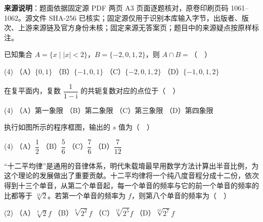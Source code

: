 

\begin{gktip}
\textbf{来源说明}：题面依据固定源 PDF 两页 A3 页面逐题核对，原卷印刷页码 1061–1062。源文件 SHA-256 已核实；固定源仅用于识别本库输入字节，出版者、版次、上游来源链及官方身份未核；固定来源无答案页；题目中的来源疑点按原样标注。
\end{gktip}


\begin{question}
已知集合 $A=\{x\mid |x|<2\}$，$B=\{-2,0,1,2\}$，则 $A\cap B=$（　）

\begin{gkopts}(4)
\task （A）$\{0,1\}$
\task （B）$\{-1,0,1\}$
\task （C）$\{-2,0,1,2\}$
\task （D）$\{-1,0,1,2\}$
\end{gkopts}

\end{question}
\begin{question}
在复平面内，复数 $\dfrac{1}{1-\mathrm i}$ 的共轭复数对应的点位于（　）

\begin{gkopts}(4)
\task （A）第一象限
\task （B）第二象限
\task （C）第三象限
\task （D）第四象限
\end{gkopts}

\Needspace{0.4\textheight}
\end{question}
\begin{question}
执行如图所示的程序框图，输出的 $s$ 值为（　）
\nopagebreak[4]
\begin{center}\end{center}
\nopagebreak[4]
\begin{gkopts}(4)
\task （A）$\dfrac12$
\task （B）$\dfrac56$
\task （C）$\dfrac76$
\task （D）$\dfrac7{12}$
\end{gkopts}

\end{question}
\begin{question}
“十二平均律”是通用的音律体系，明代朱载堉最早用数学方法计算出半音比例，为这个理论的发展做出了重要贡献。十二平均律将一个纯八度音程分成十二份，依次得到十三个单音，从第二个单音起，每一个单音的频率与它的前一个单音的频率的比都等于 $\sqrt[12]{2}$。若第一个单音的频率为 $f$，则第八个单音的频率为（　）

\begin{gkopts}(2)
\task （A）$\sqrt[3]{2}f$
\task （B）$\sqrt[3]{2^2}f$
\task （C）$\sqrt[12]{2^5}f$
\task （D）$\sqrt[12]{2^7}f$
\end{gkopts}

\Needspace{0.4\textheight}
\end{question}
